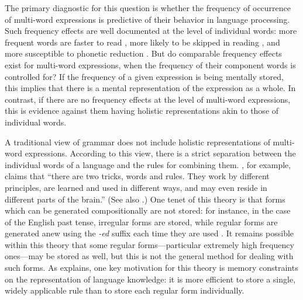 \documentclass[authoryear]{elsarticle}
\begin{document}
The primary diagnostic for this question is whether the frequency of occurrence of multi-word expressions is predictive of their behavior in language processing. Such frequency effects are well documented at the level of individual words: more frequent words are faster to read \citep{Inhoff:1986vs,Rayner:1986ud,Rayner:1996wa}, more likely to be skipped in reading \citep{Rayner:1996wa,Rayner:1996vb}, and more susceptible to phonetic reduction \citep{Bybee:1999tm,Gregory:1999vs}. But do comparable frequency effects exist for multi-word expressions, when the frequency of their component words is controlled for? If the frequency of a given expression is being mentally stored, this implies that there is a mental representation of the expression as a whole. In contrast, if there are no frequency effects at the level of multi-word expressions, this is evidence against them having holistic representations akin to those of individual words.

A traditional view of grammar does not include holistic representations of multi-word expressions. According to this view, there is a strict separation between the individual words of a language and the rules for combining them. \citet{Pinker:2000wf}, for example, claims that ``there are two tricks, words and rules. They work by different principles, are learned and used in different ways, and may even reside in different parts of the brain.'' (See also  \citealp{Ullman:2001vd, Ullman:2005jf}.) One tenet of this theory is that forms which can be generated compositionally are not stored: for instance, in the case of the English past tense, irregular forms are stored, while regular forms are generated anew using the \emph{-ed} suffix each time they are used \citep{Pinker:1991vn}. It remains possible within this theory that some regular forms---particular extremely high frequency ones---may be stored as well, but this is not the general method for dealing with such forms. As \citet{Pinker:2000wf} explains, one key motivation for this theory is memory constraints on the representation of language knowledge: it is more efficient to store a single, widely applicable rule than to store each regular form individually.
\end{document}
